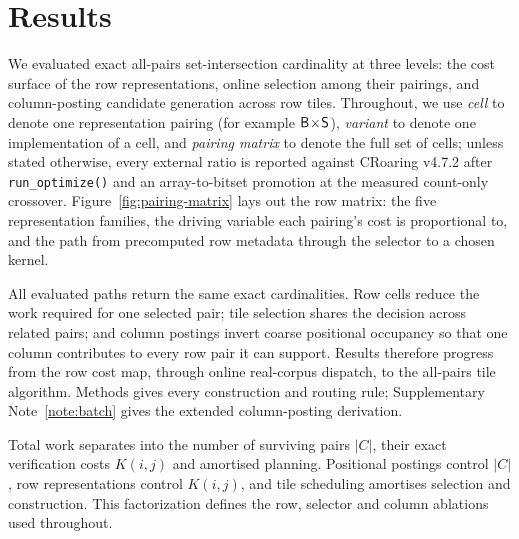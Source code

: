\section*{Results}
\label{sec:results}

We evaluated exact all-pairs set-intersection cardinality at three levels: the cost surface of the
row representations, online selection among their pairings, and column-posting candidate generation
across row tiles. Throughout, we use
\emph{cell} to denote one representation pairing (for example $\textsf{B}\!\times\!\textsf{S}$), \emph{variant} to
denote one implementation of a cell, and \emph{pairing matrix} to denote the full set of cells;
unless stated otherwise, every external ratio is reported against CRoaring v4.7.2 after
\texttt{run\_optimize()} and an array-to-bitset promotion at the measured count-only crossover.
Figure~\ref{fig:pairing-matrix}
lays out the row matrix: the five representation families,
the driving variable each pairing's cost is proportional to, and the path from precomputed row
metadata through the selector to a chosen kernel.

All evaluated paths return the same exact cardinalities. Row cells reduce the work required for one
selected pair; tile selection shares the decision across related pairs; and column postings invert
coarse positional occupancy so that one column contributes to every row pair it can support. Results
therefore progress from the row cost map, through online real-corpus dispatch, to the all-pairs tile
algorithm. Methods gives every construction and routing rule; Supplementary
Note~\ref{note:batch} gives the extended column-posting derivation.

Total work separates into the number of surviving pairs $|C|$, their exact verification costs
$K(i,j)$ and amortised planning. Positional postings control $|C|$, row representations control
$K(i,j)$, and tile scheduling amortises selection and construction. This factorization defines the
row, selector and column ablations used throughout.

